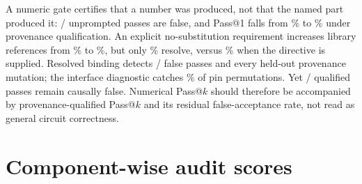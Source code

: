 A numeric gate certifies that a number was produced, not that the named part
produced it: \BareFalse{}/\BarePasses{} unprompted passes are false, and Pass@1
falls from \PassOneBareNumeric{}\% to \PassOneBareProv{}\% under provenance
qualification. An explicit no-substitution requirement increases library
references from \FactBareRefRate{}\% to \FactRequirementRefRate{}\%, but only
\FactRequirementResRate{}\% resolve, versus \FactLibraryResRate{}\% when the
directive is supplied. Resolved binding detects \ProvTP{}/\FalseAcceptTotal{}
false passes and every held-out provenance mutation; the interface diagnostic
catches \MutPinPermuteRate{}\% of pin permutations. Yet
\ProvFN{}/\StageProvAccepted{} qualified passes remain causally false.
Numerical Pass@$k$ should therefore be accompanied by provenance-qualified
Pass@$k$ and its residual false-acceptance rate, not read as general circuit
correctness.




\clearpage
\appendix
\section{Component-wise audit scores}
\label{app:ablation}

